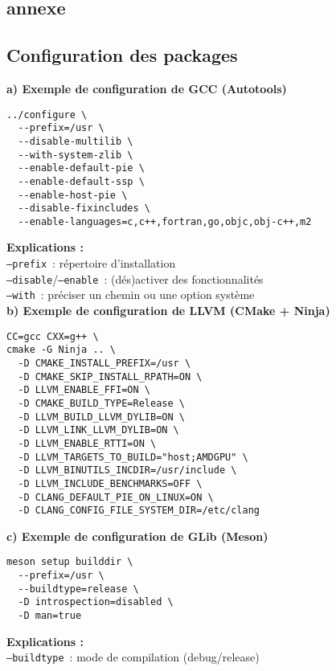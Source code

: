 \begin{appendix}
\chapter{annexe}


\section{Configuration des packages} \label{sec:config-packages}
\medskip
    \noindent\textbf{a) Exemple de configuration de GCC (Autotools)}  
    \begin{verbatim}
../configure \
  --prefix=/usr \
  --disable-multilib \
  --with-system-zlib \
  --enable-default-pie \
  --enable-default-ssp \
  --enable-host-pie \
  --disable-fixincludes \
  --enable-languages=c,c++,fortran,go,objc,obj-c++,m2
    \end{verbatim}
    \textbf{Explications :}  \\
    \texttt{--prefix} : répertoire d’installation  \\
    \texttt{--disable}/\texttt{--enable} : (dés)activer des fonctionnalités  \\
    \texttt{--with} : préciser un chemin ou une option système \\

    \medskip
    \noindent\textbf{b) Exemple de configuration de LLVM (CMake + Ninja)}  
    \begin{verbatim}
CC=gcc CXX=g++ \
cmake -G Ninja .. \
  -D CMAKE_INSTALL_PREFIX=/usr \
  -D CMAKE_SKIP_INSTALL_RPATH=ON \
  -D LLVM_ENABLE_FFI=ON \
  -D CMAKE_BUILD_TYPE=Release \
  -D LLVM_BUILD_LLVM_DYLIB=ON \
  -D LLVM_LINK_LLVM_DYLIB=ON \
  -D LLVM_ENABLE_RTTI=ON \
  -D LLVM_TARGETS_TO_BUILD="host;AMDGPU" \
  -D LLVM_BINUTILS_INCDIR=/usr/include \
  -D LLVM_INCLUDE_BENCHMARKS=OFF \
  -D CLANG_DEFAULT_PIE_ON_LINUX=ON \
  -D CLANG_CONFIG_FILE_SYSTEM_DIR=/etc/clang
    \end{verbatim}

    \medskip
  
    \noindent\textbf{c) Exemple de configuration de GLib (Meson)}  
    \begin{verbatim}
meson setup builddir \
  --prefix=/usr \
  --buildtype=release \
  -D introspection=disabled \
  -D man=true
    \end{verbatim}
    \textbf{Explications :}  \\
    \texttt{--buildtype} : mode de compilation (debug/release)\\




\end{appendix}
